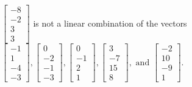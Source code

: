 \begin{exercise}
\begin{exerciseStatement}
  \end{exerciseStatement}
  \begin{exerciseAnswer}
   \(\left[\begin{array}{c}
-8 \\
-2 \\
3 \\
3
\end{array}\right]\) 
  	 is not  
	a linear combination of the vectors \(\left[\begin{array}{c}
-1 \\
1 \\
-4 \\
-3
\end{array}\right] , \left[\begin{array}{c}
0 \\
-2 \\
-1 \\
-3
\end{array}\right] , \left[\begin{array}{c}
0 \\
-1 \\
2 \\
1
\end{array}\right] , \left[\begin{array}{c}
3 \\
-7 \\
15 \\
8
\end{array}\right] , \text{ and } \left[\begin{array}{c}
-2 \\
10 \\
-9 \\
1
\end{array}\right]\).

	
  


  \end{exerciseAnswer}
\end{exercise}